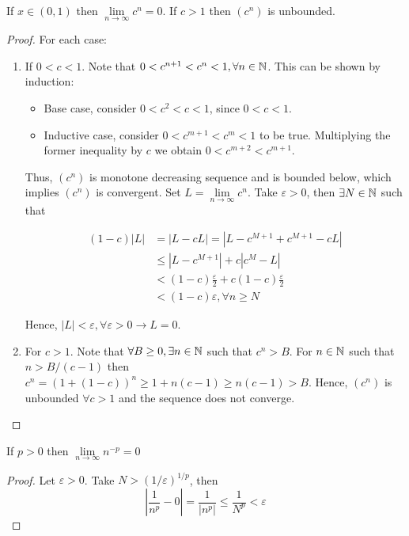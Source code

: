 \begin{theorem}
    If $x \in (0,1)$ then $\lim \limits_{n \to \infty} c^n = 0$. If $c > 1$ then $(c^n)$ is unbounded.
\end{theorem}

\begin{proof}
    For each case:
    \begin{enumerate}
        \item If $0 < c < 1$. Note that $0 < c^{n+1} < c^n < 1, \forall n \in \mathbb{N}$. This can be shown by induction:
        \begin{itemize}
            \item Base case, consider $0 < c^2 < c < 1$, since $0 < c < 1$.
            \item Inductive case, consider $0 < c^{m+1} < c^m < 1$ to be true. Multiplying the former inequality by $c$ we obtain $0 < c^{m+2} < c^{m+1}$.
        \end{itemize}
        Thus, $(c^n)$ is monotone decreasing sequence and is bounded below, which implies $(c^n)$ is convergent. Set $L = \lim \limits_{n \to \infty} c^n$. Take $\varepsilon > 0$, then $\exists N \in \mathbb{N}$ such that
        
        \begin{align*}
            (1-c)|L| &= |L-cL| = |L - c^{M+1} + c^{M+1} - cL| \\
            &\leq |L-c^{M+1}| + c|c^M-L| \\
            &< (1-c)\frac{\varepsilon}{2} + c(1-c)\frac{\varepsilon}{2} \\
            &< (1-c) \varepsilon, \forall n \geq N
        \end{align*}
        
        Hence, $|L| < \varepsilon, \forall \varepsilon>0 \longrightarrow L = 0$.
        \item For $c > 1$. Note that $\forall B \geq 0, \exists n \in \mathbb{N}$ such that $c^n > B$. For $n \in \mathbb{N}$ such that $n > B/(c-1)$ then $c^n = (1+(1-c))^n \geq 1 + n(c-1) \geq n(c-1) > B$. Hence, $(c^n)$ is unbounded $\forall c > 1$ and the sequence does not converge.
    \end{enumerate}
\end{proof}

\begin{theorem}
    If $p>0$ then $\lim \limits_{n \to \infty}n^{-p} = 0$
\end{theorem}

\begin{proof}
    Let $\varepsilon > 0$. Take $N > (1/\varepsilon)^{1/p}$, then
    \begin{equation*}
        \left |
        \frac{1}{n^p} - 0
        \right | = 
        \frac{1}{|n^p|} \leq
        \frac{1}{N^p} <
        \varepsilon
    \end{equation*}
\end{proof}

